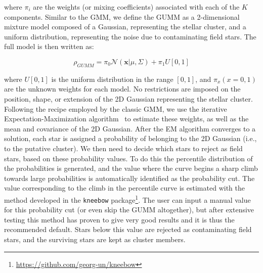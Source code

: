 \documentclass{aa}
\begin{document}
 \noindent where $\pi_i$ are the weights (or mixing coefficients)
 associated with each of the $K$ components. Similar to the GMM, we define the
 GUMM as a 2-dimensional mixture model composed of a Gaussian, representing
 the stellar cluster, and a uniform distribution, representing the noise due
 to contaminating field stars. The full model is then written as:

 \begin{equation}
 \rho_{GUMM}=
 \pi_{0} \mathcal{N}\left(\mathbf{x} | \mu, \Sigma\right)+ \pi_{1} U[0,1]
 \end{equation}

 \noindent where $U[0,1]$ is the uniform distribution in the range $[0,1]$,
 and $\pi_{x} (x=0,1)$ are the unknown weights for each model.
 No restrictions are imposed on the position, shape, or
 extension of the 2D Gaussian representing the stellar cluster.
 Following the recipe employed by the classic GMM, we use the
 iterative Expectation-Maximization algorithm~\citep[EM,][]{dempster_1977} to
 estimate these  weights, as well as the mean and covariance of the 2D
 Gaussian. After the EM algorithm converges to a solution, each star is
 assigned a probability of belonging to the 2D Gaussian 
 (i.e., to the putative cluster). We then need to decide which stars to reject
 as field stars, based on these probability values. To do this the percentile
 distribution of the probabilities is generated, and the value
 where the curve begins a sharp climb towards large probabilities is
 automatically identified as the probability cut. The value
 corresponding to the climb in the percentile curve is estimated with the
 method developed in the \texttt{kneebow} package\footnote{
 \url{https://github.com/georg-un/kneebow}}. The user can input a
 manual value for this probability cut (or even skip the GUMM altogether), but
 after extensive testing this method has proven to give very good results and
 it is thus the recommended default.
 Stars below this value are rejected as contaminating field stars, and the
 surviving stars are kept as cluster members.
\end{document}
